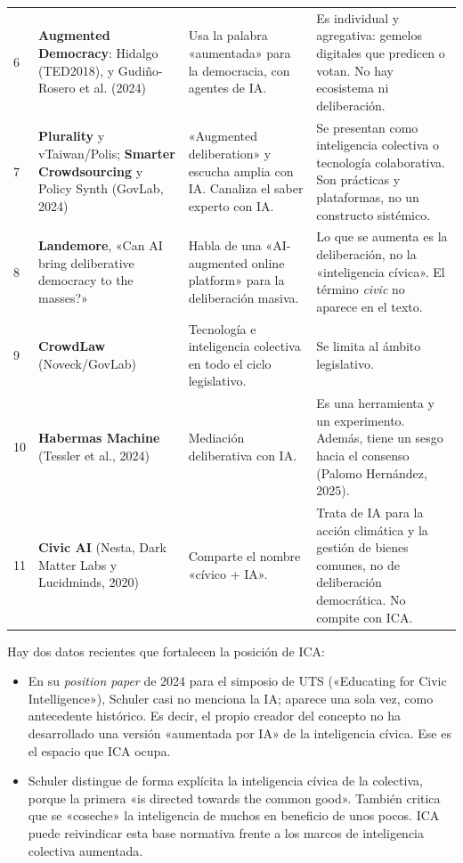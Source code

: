 \documentclass[11pt,a4paper]{article}
\begin{document}
{\begin{longtable}{P{0.4cm}P{4.0cm}P{4.8cm}P{4.9cm}}
6 & \textbf{Augmented Democracy}: Hidalgo (TED2018), y Gudiño-Rosero et al. (2024) &
Usa la palabra «aumentada» para la democracia, con agentes de IA. &
Es individual y agregativa: gemelos digitales que predicen o votan. No hay ecosistema ni deliberación.\\
7 & \textbf{Plurality} y vTaiwan/Polis; \textbf{Smarter Crowdsourcing} y Policy Synth (GovLab, 2024) &
«Augmented deliberation» y escucha amplia con IA. Canaliza el saber experto con IA. &
Se presentan como inteligencia colectiva o tecnología colaborativa. Son prácticas y plataformas, no un constructo sistémico.\\
8 & \textbf{Landemore}, «Can AI bring deliberative democracy to the masses?» &
Habla de una «AI-augmented online platform» para la deliberación masiva. &
Lo que se aumenta es la deliberación, no la «inteligencia cívica». El término \emph{civic} no aparece en el texto.\\
9 & \textbf{CrowdLaw} (Noveck/GovLab) &
Tecnología e inteligencia colectiva en todo el ciclo legislativo. &
Se limita al ámbito legislativo.\\
10 & \textbf{Habermas Machine} (Tessler et al., 2024) &
Mediación deliberativa con IA. &
Es una herramienta y un experimento. Además, tiene un sesgo hacia el consenso (Palomo Hernández, 2025).\\
11 & \textbf{Civic AI} (Nesta, Dark Matter Labs y Lucidminds, 2020) &
Comparte el nombre «cívico + IA». &
Trata de IA para la acción climática y la gestión de bienes comunes, no de deliberación democrática. No compite con ICA.\\
\end{longtable}
}

Hay dos datos recientes que fortalecen la posición de ICA:
\begin{itemize}
  \item En su \emph{position paper} de 2024 para el simposio de UTS («Educating for Civic Intelligence»), Schuler casi no menciona la IA; aparece una sola vez, como antecedente histórico. Es decir, el propio creador del concepto no ha desarrollado una versión «aumentada por IA» de la inteligencia cívica. Ese es el espacio que ICA ocupa.
  \item Schuler distingue de forma explícita la inteligencia cívica de la colectiva, porque la primera «is directed towards the common good». También critica que se «coseche» la inteligencia de muchos en beneficio de unos pocos. ICA puede reivindicar esta base normativa frente a los marcos de inteligencia colectiva aumentada.
\end{itemize}
\end{document}
